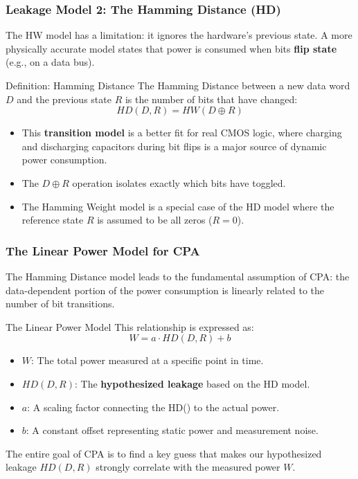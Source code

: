 \begin{frame}
    \frametitle{Leakage Model 2: The Hamming Distance (HD)}
    
    The HW model has a limitation: it ignores the hardware's previous state. A more physically accurate model states that power is consumed when bits \textbf{flip state} (e.g., on a data bus).

    \begin{block}{Definition: Hamming Distance}
        The Hamming Distance between a new data word $D$ and the previous state $R$ is the number of bits that have changed:
        \[
            HD(D, R) = HW(D \oplus R)
        \]
    \end{block}

    \begin{itemize}
        \item This \textbf{transition model} is a better fit for real CMOS logic, where charging and discharging capacitors during bit flips is a major source of dynamic power consumption.
        \item The $D \oplus R$ operation isolates exactly which bits have toggled.
        \item The Hamming Weight model is a special case of the HD model where the reference state $R$ is assumed to be all zeros ($R=0$).
    \end{itemize}
\end{frame}

\begin{frame}
    \frametitle{The Linear Power Model for CPA}

    The Hamming Distance model leads to the fundamental assumption of CPA: the data-dependent portion of the power consumption is linearly related to the number of bit transitions.

    \begin{alertblock}{The Linear Power Model}
    This relationship is expressed as:
    $$ W = a \cdot HD(D,R) + b $$
    \begin{itemize}
        \item $W$: The total power measured at a specific point in time.
        \item $HD(D,R)$: The \textbf{hypothesized leakage} based on the HD model.
        \item $a$: A scaling factor connecting the HD() to the actual power.
        \item $b$: A constant offset representing static power and measurement noise.
    \end{itemize}
    \end{alertblock}
    
    The entire goal of CPA is to find a key guess that makes our hypothesized leakage $HD(D,R)$ strongly correlate with the measured power $W$.
\end{frame}



